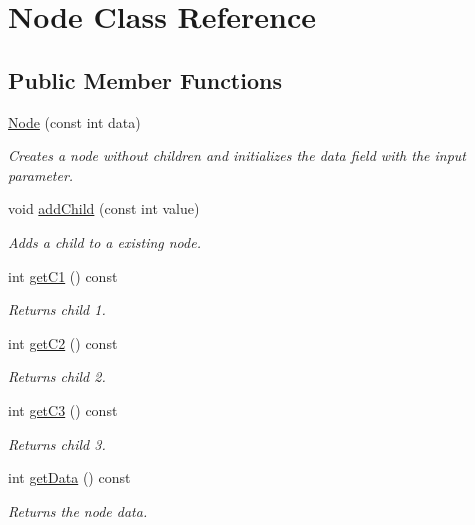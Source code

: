 \hypertarget{classNode}{}\section{Node Class Reference}
\label{classNode}
\subsection*{Public Member Functions}
\begin{DoxyCompactItemize}
\item 
\hyperlink{classNode_a92589d30b37760493978baedac11c4af}{Node} (const int data)
\begin{DoxyCompactList}\small\item\em Creates a node without children and initializes the data field with the input parameter. \end{DoxyCompactList}\item 
void \hyperlink{classNode_a0534fe9af130ed888e44f9c9b2a8144d}{add\+Child} (const int value)
\begin{DoxyCompactList}\small\item\em Adds a child to a existing node. \end{DoxyCompactList}\item 
int \hyperlink{classNode_a9c32461ac040d49aff5d25b41b0353a7}{get\+C1} () const
\begin{DoxyCompactList}\small\item\em Returns child 1. \end{DoxyCompactList}\item 
int \hyperlink{classNode_aea950a9a2d050dc1aa571a5282c8b410}{get\+C2} () const
\begin{DoxyCompactList}\small\item\em Returns child 2. \end{DoxyCompactList}\item 
int \hyperlink{classNode_a3b941af12dfb8085e4f621ed62469ba5}{get\+C3} () const
\begin{DoxyCompactList}\small\item\em Returns child 3. \end{DoxyCompactList}\item 
int \hyperlink{classNode_a4bf12425ae4895ac3ec27c91fea8f646}{get\+Data} () const
\begin{DoxyCompactList}\small\item\em Returns the node data. \end{DoxyCompactList}\item 

\end{DoxyCompactItemize}
